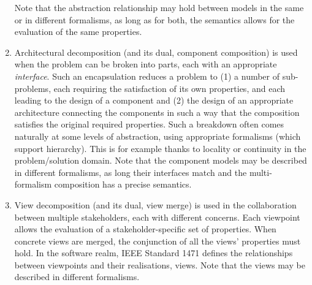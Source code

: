 \begin{enumerate}
    Note that the abstraction relationship may hold between models in the same or in different formalisms, as long as for both, the semantics allows for the evaluation of the same properties.
    \item Architectural decomposition (and its dual, component composition) is used when
    the problem can be broken into parts, each with an appropriate \emph{interface}.
    Such an encapsulation reduces a problem to (1) a number of sub-problems, each requiring 
    the satisfaction of its own properties, and each leading to the 
    design of a component and (2) the design of an appropriate architecture connecting the components
    in such a way that the composition satisfies the original required properties.
    Such a breakdown often comes naturally at some levels of abstraction, using appropriate formalisms
    (which support hierarchy).
    This is for example thanks to locality or continuity in the problem/solution domain.
    Note that the component models may be described in different formalisms, as long their interfaces match and the multi-formalism composition has a precise semantics.
    \item View decomposition (and its dual, view merge) is used in the 
    collaboration between multiple stakeholders, each with different concerns.
    Each viewpoint allows the evaluation of a stakeholder-specific set of properties. 
    When concrete views are merged, the conjunction of all the views' properties must hold.
    In the software realm, IEEE Standard 1471 defines the relationships between viewpoints and 
    their realisations, views.
    Note that the views may be described in different formalisms.
\end{enumerate}

